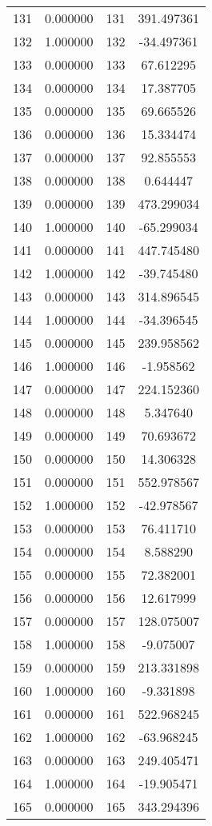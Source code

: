 \documentclass[12pt]{article}
\begin{document}
\begin{longtable}{@{}cccc@{}}
131 & 0.000000 & 131 & 391.497361 \\
132 & 1.000000 & 132 & -34.497361 \\
133 & 0.000000 & 133 & 67.612295 \\
134 & 0.000000 & 134 & 17.387705 \\
135 & 0.000000 & 135 & 69.665526 \\
136 & 0.000000 & 136 & 15.334474 \\
137 & 0.000000 & 137 & 92.855553 \\
138 & 0.000000 & 138 & 0.644447 \\
139 & 0.000000 & 139 & 473.299034 \\
140 & 1.000000 & 140 & -65.299034 \\
141 & 0.000000 & 141 & 447.745480 \\
142 & 1.000000 & 142 & -39.745480 \\
143 & 0.000000 & 143 & 314.896545 \\
144 & 1.000000 & 144 & -34.396545 \\
145 & 0.000000 & 145 & 239.958562 \\
146 & 1.000000 & 146 & -1.958562 \\
147 & 0.000000 & 147 & 224.152360 \\
148 & 0.000000 & 148 & 5.347640 \\
149 & 0.000000 & 149 & 70.693672 \\
150 & 0.000000 & 150 & 14.306328 \\
151 & 0.000000 & 151 & 552.978567 \\
152 & 1.000000 & 152 & -42.978567 \\
153 & 0.000000 & 153 & 76.411710 \\
154 & 0.000000 & 154 & 8.588290 \\
155 & 0.000000 & 155 & 72.382001 \\
156 & 0.000000 & 156 & 12.617999 \\
157 & 0.000000 & 157 & 128.075007 \\
158 & 1.000000 & 158 & -9.075007 \\
159 & 0.000000 & 159 & 213.331898 \\
160 & 1.000000 & 160 & -9.331898 \\
161 & 0.000000 & 161 & 522.968245 \\
162 & 1.000000 & 162 & -63.968245 \\
163 & 0.000000 & 163 & 249.405471 \\
164 & 1.000000 & 164 & -19.905471 \\
165 & 0.000000 & 165 & 343.294396 \\

\end{longtable}
\end{document}
